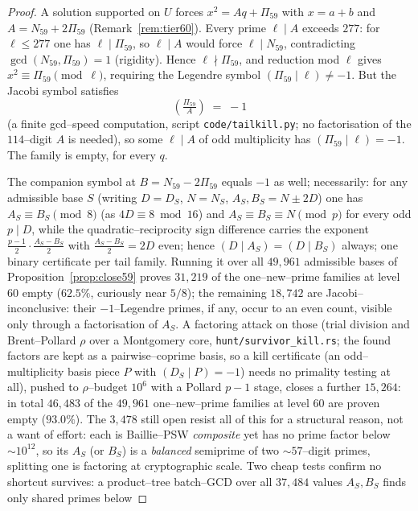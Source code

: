 \documentclass[11pt]{article}
\theoremstyle{definition}
\begin{document}
\begin{proof}
A solution supported on $U$ forces $x^2=Aq+\Pi_{59}$ with $x=a+b$ and $A=N_{59}+2\Pi_{59}$
(Remark~\ref{rem:tier60}). Every prime $\ell\mid A$ exceeds $277$: for $\ell\le277$ one has
$\ell\mid\Pi_{59}$, so $\ell\mid A$ would force $\ell\mid N_{59}$, contradicting
$\gcd(N_{59},\Pi_{59})=1$ (rigidity). Hence $\ell\nmid\Pi_{59}$, and reduction mod $\ell$ gives
$x^2\equiv\Pi_{59}\pmod\ell$, requiring the Legendre symbol $(\Pi_{59}\mid\ell)\neq-1$. But the
Jacobi symbol satisfies
\[ \left(\tfrac{\Pi_{59}}{A}\right)\;=\;-1 \]
(a finite gcd--speed computation, script \texttt{code/tailkill.py}; no factorisation of the
$114$--digit $A$ is needed), so some $\ell\mid A$ of odd multiplicity has $(\Pi_{59}\mid\ell)=-1$.
The family is empty, for every $q$.

The companion symbol at $B=N_{59}-2\Pi_{59}$ equals $-1$ as well; necessarily: for any
admissible base $S$ (writing $D=D_S$, $N=N_S$, $A_S,B_S=N\pm2D$) one has $A_S\equiv B_S\pmod 8$
(as $4D\equiv8\bmod{16}$) and $A_S\equiv B_S\equiv N\pmod p$ for every odd $p\mid D$, while the
quadratic--reciprocity sign difference carries the exponent $\tfrac{p-1}{2}\cdot\tfrac{A_S-B_S}{2}$
with $\tfrac{A_S-B_S}{2}=2D$ even; hence $(D\mid A_S)=(D\mid B_S)$ always; one binary
certificate per tail family. Running it over all $49{,}961$ admissible bases of
Proposition~\ref{prop:close59} proves $31{,}219$ of the one--new--prime families at level $60$
empty ($62.5\%$, curiously near $5/8$); the remaining $18{,}742$ are Jacobi--inconclusive: their
$-1$--Legendre primes, if any, occur to an even count, visible only through a factorisation of
$A_S$. A factoring attack on those (trial division and Brent--Pollard $\rho$ over a Montgomery
core, \texttt{hunt/survivor\_kill.rs}; the found factors are kept as a pairwise--coprime basis, so
a kill certificate (an odd--multiplicity basis piece $P$ with $(D_S\mid P)=-1$) needs no
primality testing at all), pushed to $\rho$--budget $10^6$ with a Pollard $p-1$ stage, closes a
further $15{,}264$: in total $46{,}483$ of the $49{,}961$ one--new--prime families at level $60$
are proven empty ($93.0\%$). The $3{,}478$ still open resist all of this for a structural reason,
not a want of effort: each is Baillie--PSW \emph{composite} yet has no prime factor below ${\sim}
10^{12}$, so its $A_S$ (or $B_S$) is a \emph{balanced} semiprime of two ${\sim}57$--digit primes,
splitting one is factoring at cryptographic scale. Two cheap tests confirm no shortcut survives:
a product--tree batch--GCD over all $37{,}484$ values $A_S,B_S$ finds only shared primes below

\end{proof}
\end{document}
